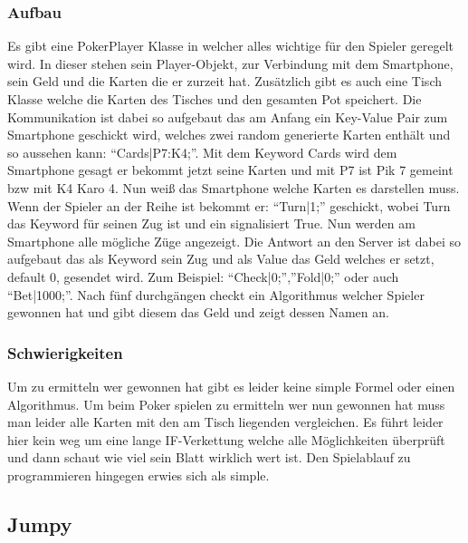 \subsubsection{Aufbau}
Es gibt eine PokerPlayer Klasse in welcher alles wichtige für den Spieler geregelt wird. In dieser stehen sein Player-Objekt, zur Verbindung mit dem Smartphone, sein Geld und die Karten die er zurzeit hat. Zusätzlich gibt es auch eine Tisch Klasse welche die Karten des Tisches und den gesamten Pot speichert. Die Kommunikation ist dabei so aufgebaut das am Anfang ein Key-Value Pair zum Smartphone geschickt wird, welches zwei random generierte Karten enthält und so aussehen kann: “Cards|P7:K4;”. Mit dem Keyword Cards wird dem Smartphone gesagt er bekommt jetzt seine Karten und mit P7 ist Pik 7 gemeint bzw mit K4 Karo 4. Nun weiß das Smartphone welche Karten es darstellen muss. Wenn der Spieler an der Reihe ist bekommt er: “Turn|1;” geschickt, wobei Turn das Keyword für seinen Zug ist und ein signalisiert True. Nun werden am Smartphone alle mögliche Züge angezeigt. Die Antwort an den Server ist dabei so aufgebaut das als Keyword sein Zug und als Value das Geld welches er setzt, default 0, gesendet wird. Zum Beispiel: “Check|0;”,”Fold|0;” oder auch “Bet|1000;”. Nach fünf durchgängen checkt ein Algorithmus welcher Spieler gewonnen hat und gibt diesem das Geld und zeigt dessen Namen an.
\subsubsection{Schwierigkeiten}
Um zu ermitteln wer gewonnen hat gibt es leider keine simple Formel oder einen Algorithmus. Um beim Poker spielen zu ermitteln wer nun gewonnen hat muss man leider alle Karten mit den am Tisch liegenden vergleichen. Es führt leider hier kein weg um eine lange IF-Verkettung welche alle Möglichkeiten überprüft und dann schaut wie viel sein Blatt wirklich wert ist. Den Spielablauf zu programmieren hingegen erwies sich als simple.
\subsection{Jumpy}
